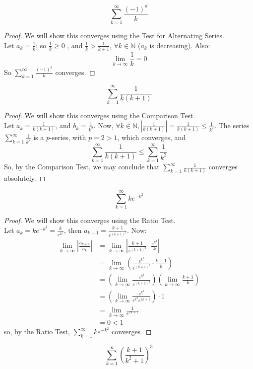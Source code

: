 \documentclass{article}
\begin{document}
			\item $$\sum_{k=1}^\infty \frac{(-1)^k}{k}$$
			\begin{proof}
			We will show this converges using the Test for Alternating Series.\\
			Let $a_k = \frac{1}{k}$; so $\frac{1}{k} \geq 0$ , and $\frac{1}{k} > \frac{1}{k+1}$, $\forall k \in \mathbb{N}$ ($a_k$ is decreasing). Also:
			$$\lim_{k\to\infty}\frac{1}{k} = 0$$
			So $\sum_{k=1}^\infty \frac{(-1)^k}{k}$ converges.
			\end{proof}
			\item $$\sum_{k=1}^\infty \frac{1}{k(k+1)}$$
			\begin{proof}
			We will show this converges using the Comparison Test.\\
			Let $a_k = \frac{1}{k(k+1)}$, and $b_k = \frac{1}{k^2}$. Now, $\forall k \in \mathbb{N},\left\vert\frac{1}{k(k+1)}\right\vert = \frac{1}{k(k+1)} \leq \frac{1}{k^2}$. The series $\sum_{k =1}^\infty \frac{1}{k^2}$ is a $p$-series, with $p = 2 > 1$, which converges, and $$\sum_{k=1}^\infty \frac{1}{k(k+1)} \leq \sum_{k =1}^\infty \frac{1}{k^2}$$
			So, by the Comparison Test, we may conclude that $\sum_{k=1}^\infty \frac{1}{k(k+1)}$ converges absolutely.
			\end{proof}
			\pagebreak
			\item $$\sum_{k=1}^\infty ke^{-k^2}$$
			\begin{proof}
			We will show this converges using the Ratio Test.\\
			Let $a_k = ke^{-k^2} = \frac{k}{e^{k^2}}$, then $a_{k+1} = \frac{k+1}{e^{(k+1)^2}}$. Now:
			\begin{align*}
			\lim_{k\to\infty}\left\vert \frac{a_{k+1}}{a_k}\right\vert &= \lim_{k\to\infty}\left\vert \frac{k+1}{e^{(k+1)^2}}\cdot\frac{e^{k^2}}{k}\right\vert\\
			&= \lim_{k\to\infty}\left( \frac{e^{k^2}}{e^{(k+1)^2}}\cdot\frac{k+1}{k}\right)\\
			&= \left(\lim_{k\to\infty}\frac{e^{k^2}}{e^{(k+1)^2}}\right)\left(\lim_{k\to\infty}\frac{k+1}{k}\right)\\
			&= \left(\lim_{k\to\infty}\frac{e^{k^2}}{e^{k^2}e^{2k + 1}}\right)\cdot 1\\
			&= \lim_{k\to\infty}\frac{1}{e^{2k + 1}}\\
			&= 0 < 1
			\end{align*}
			so, by the Ratio Test, $\sum_{k=1}^\infty ke^{-k^2}$ converges.
			\end{proof}
			\item $$\sum_{k=1}^\infty \left(\frac{k+1}{k^2+1}\right)^3$$
\end{document}
